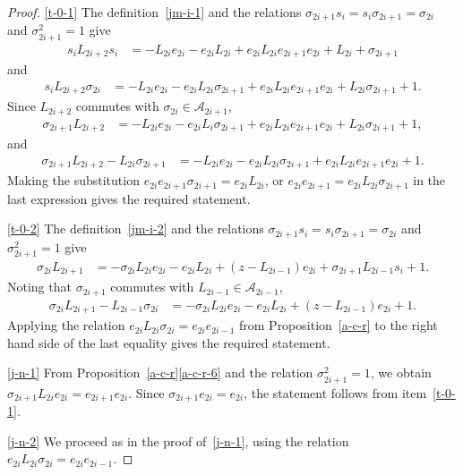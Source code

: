 \documentclass[11pt,a4paper,reqno,svgnames]{amsart}
\theoremstyle{plain}
\theoremstyle{definition}
\numberwithin{equation}{section}
\begin{document}
\begin{proof}
\eqref{t-0-1} The definition~\eqref{jm-i-1} and the relations 
$\sigma_{2i+1}s_i=s_i\sigma_{2i+1}=\sigma_{2i}$ and $\sigma_{2i+1}^2=1$ give 
\begin{align*}
s_iL_{2i+2}s_i&=-L_{2i}e_{2i}-e_{2i}L_{2i}+e_{2i}L_{2i}e_{2i+1}e_{2i}+L_{2i}+\sigma_{2i+1}
\end{align*}
and
\begin{align*}
s_iL_{2i+2}\sigma_{2i}&=-L_{2i}e_{2i}-e_{2i}L_{2i}\sigma_{2i+1}+e_{2i}L_{2i}e_{2i+1}e_{2i} +L_{2i}\sigma_{2i+1}+1.
\end{align*}
Since $L_{2i+2}$ commutes with $\sigma_{2i}\in\mathcal{A}_{2i+1}$, 
\begin{align*}
\sigma_{2i+1}L_{2i+2}&=-L_{2i}e_{2i}-e_{2i}L_i\sigma_{2i+1}+e_{2i}L_{2i}e_{2i+1}e_{2i} +L_{2i}\sigma_{2i+1}+1,
\end{align*}
and
\begin{align*}
\sigma_{2i+1}L_{2i+2}-L_{2i}\sigma_{2i+1}&=-L_{2i}e_{2i}-e_{2i}L_{2i}\sigma_{2i+1}+e_{2i}L_{2i}e_{2i+1}e_{2i}+1.
\end{align*}
Making the substitution $e_{2i}e_{2i+1}\sigma_{2i+1}=e_{2i}L_{2i}$, or $e_{2i}e_{2i+1}=e_{2i}L_{2i}\sigma_{2i+1}$ in the last expression gives the required statement.

\eqref{t-0-2} The definition~\eqref{jm-i-2} and the relations $\sigma_{2i+1}s_i=s_i\sigma_{2i+1}=\sigma_{2i}$ and $\sigma_{2i+1}^2=1$ give
\begin{align*}
\sigma_{2i}L_{2i+1}&=-\sigma_{2i}L_{2i}e_{2i}-e_{2i}L_{2i}
+(z-L_{2i-1})e_{2i}+\sigma_{2i+1}L_{2i-1}s_i+1.
\end{align*}
Noting that $\sigma_{2i+1}$ commutes with $L_{2i-1}\in\mathcal{A}_{2i-1}$, 
\begin{align*}
\sigma_{2i}L_{2i+1}-L_{2i-1}\sigma_{2i}&=-\sigma_{2i}L_{2i}e_{2i}-e_{2i}L_{2i}+(z-L_{2i-1})e_{2i}+1.
\end{align*}
Applying the relation $e_{2i}L_{2i}\sigma_{2i}=e_{2i}e_{2i-1}$  from Proposition~\ref{a-c-r} to the right hand side of the last equality gives the required statement.

\eqref{j-n-1} From Proposition~\ref{a-c-r}\eqref{a-c-r-6} and the relation $\sigma_{2i+1}^2=1$, we obtain $\sigma_{2i+1}L_{2i}e_{2i}=e_{2i+1}e_{2i}$. Since $\sigma_{2i+1}e_{2i}=e_{2i}$, the statement follows from item~\eqref{t-0-1}.

\eqref{j-n-2} We proceed as in the proof of~\eqref{j-n-1}, using the relation $e_{2i}L_{2i}\sigma_{2i}=e_{2i}e_{2i-1}$.
\end{proof}
\end{document}

